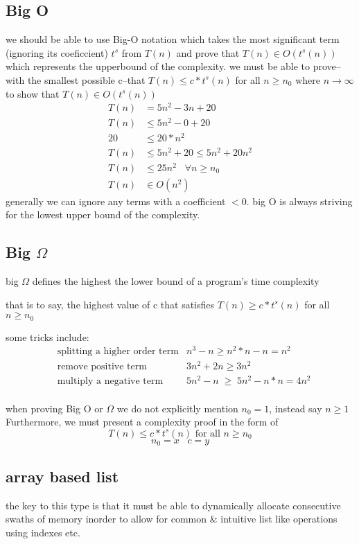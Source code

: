 \documentclass[12pt]{book}
\begin{document}
\subsection*{Big O}
we should be able to use Big-O notation which takes the most significant term (ignoring its coeficcient)
$t^s$ from $T(n)$ and prove that $T(n)\in O(t^s(n))$ which represents the upperbound of the complexity.
we must be able to prove--with the smallest possible c--that $ T(n)\leq c*t^s(n)$ for all $ n \geq n_0  $ where $n\rightarrow\infty$
to show that $ T(n) \in O(t^s(n))  $
\begin{align*} 
       T(n)    &= 5n^2 - 3n + 20\\
       T(n)    &\leq 5n^2 - 0 + 20\\
       20      &\leq 20 * n^2\\
       T(n)    &\leq 5n^2 + 20 \leq 5n^2 + 20n^2\\
       T(n)    &\leq 25n^2\;\;\;\forall n\geq n_0\\
       T(n)    &\in O(n^2) 
\end{align*}
generally we can ignore any terms with a coefficient $<0$.
big O is always striving for the lowest upper bound of the complexity.

\subsection*{Big $\Omega$}
big $\Omega$ defines the highest the lower bound of a program's time complexity

that is to say, the highest value of c that satisfies $T(n)\geq c*t^s(n)$ for all $n\geq n_0$

some tricks include:
\begin{align*}
        &\text{splitting a higher order term}   &n^3-n\geq n^2*n-n = n^2\\
        &\text{remove positive term}            &3n^2+2n\geq 3n^2\\
        &\text{multiply a negative term}        &5n^2 -n\;\geq\;5n^2 -n*n = 4n^2\\
\end{align*}

when proving Big O or $\Omega$ we do not explicitly mention $n_0=1$, instead say $n\geq1$
Furthermore, we must present a complexity proof in the form of 
\[T(n)\leq c*t^s(n) \text{ for all } n\geq n_0\]
\[n_0=x\;\;\;c=y\]


\subsection*{array based list}
the key to this type is that it must be able to dynamically allocate consecutive swaths of memory
inorder to allow for common $\&$ intuitive list like operations using indexes etc.
\end{document}
